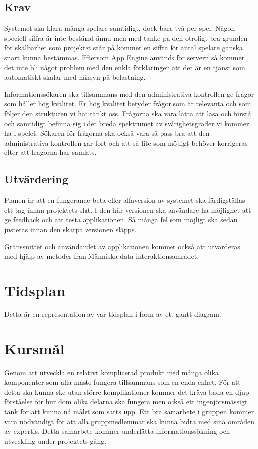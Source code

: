 \documentclass[12pt,a4paper]{article}
\begin{document}
\subsection{Krav}
Systemet ska klara många spelare samtidigt, dock bara två per spel. Någon speciell siffra är inte bestämd ännu men med tanke på den otroligt bra grunden för skalbarhet som projektet står på kommer en siffra för antal spelare ganska snart kunna bestämmas. Eftersom App Engine används för servern så kommer det inte bli något problem med den enkla förklaringen att det är en tjänst som automatiskt skalar med hänsyn på belastning. \cite{appenginescalability}

Informationssökaren ska tillsammans med den administrativa kontrollen ge frågor som håller hög kvalitet. En hög kvalitet betyder frågor som är relevanta och som följer den strukturen vi har tänkt oss. Frågorna ska vara lätta att läsa och förstå och samtidigt befinna sig i det breda spektrumet av svårighetsgrader vi kommer ha i spelet. Sökaren för frågorna ska också vara så pass bra att den administrativa kontrollen går fort och att så lite som möjligt behöver korrigeras efter att frågorna har samlats.

\subsection{Utvärdering}
Planen är att en fungerande beta eller alfaversion av systemet ska färdigställas ett tag innan projektets slut. I den här versionen ska användare ha möjlighet att ge feedback och att testa applikationen. Så många fel som möjligt ska sedan justeras innan den skarpa versionen släpps.

Gränssnittet och användandet av applikationen kommer också att utvärderas med hjälp av metoder från Människa-data-interaktionsområdet.
\appendix

\section{Tidsplan}
Detta är en representation av vår tidsplan i form av ett gantt-diagram.
\begin{figure}[H]
\centering
\end{figure} 
\pagebreak

\section{Kursmål}
Genom att utveckla en relativt komplicerad produkt med många olika komponenter som alla måste fungera tillsammans som en enda enhet. För att detta ska kunna ske utan större komplikationer kommer det kräva båda en djup förståelse för hur dom olika delarna ska fungera men också ett ingenjörsmässigt tänk för att kunna nå målet som satts upp.
Ett bra samarbete i gruppen kommer vara nödvändigt för att alla gruppmedlemmar ska kunna bidra med sina områden av expertis. Detta samarbete kommer underlätta informationssökning och utveckling under projektets gång.\\


\newpage
\printbibliography[title={Referenser}]
\end{document}
